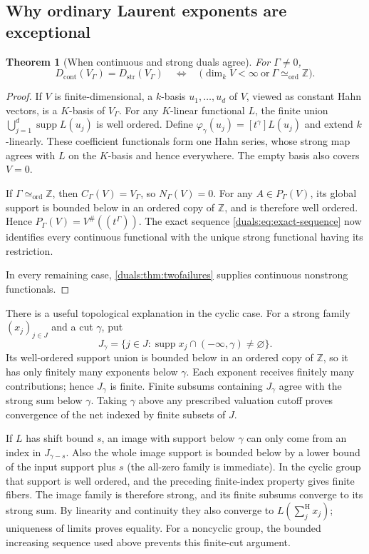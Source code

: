 \documentclass[11pt,letterpaper]{article}
\numberwithin{equation}{section}
\newtheorem{theorem}{Theorem}[section]
\theoremstyle{definition}
\theoremstyle{remark}
\newcommand{\Z}{\mathbb Z}
\newcommand{\supp}{\operatorname{supp}}
\newcommand{\Dstr}{D_{\mathrm{str}}}
\newcommand{\Dcont}{D_{\mathrm{cont}}}
\newcommand{\sH}{\mathop{\sum}\nolimits^{\mathrm H}}
\newcommand{\cyc}{\Gamma\simeq_{\mathrm{ord}}\Z}
\begin{document}
\subsection{Why ordinary Laurent exponents are exceptional}
\begin{theorem}[When continuous and strong duals agree]
\label{duals:thm:continuous-strong}
For $\Gamma\ne0$,
\[
 \Dcont(V_\Gamma)=\Dstr(V_\Gamma)
 \quad\Longleftrightarrow\quad
 \bigl(\dim_kV<\infty\ \text{or}\ \cyc\bigr).
\]
\end{theorem}
\begin{proof}
If $V$ is finite-dimensional, a $k$-basis $u_1,\ldots,u_d$ of $V$,
viewed as constant Hahn vectors, is a $K$-basis of $V_\Gamma$.
For any $K$-linear functional $L$, the finite union
$\bigcup_{j=1}^d\supp L(u_j)$ is well ordered. Define
$\varphi_\gamma(u_j)=[t^\gamma]L(u_j)$ and extend $k$-linearly.
These coefficient functionals form one Hahn series, whose strong map
agrees with $L$ on the $K$-basis and hence everywhere. The empty basis
also covers $V=0$.

If $\Gamma\simeq_{\mathrm{ord}}\Z$, then $C_\Gamma(V)=V_\Gamma$,
so $N_\Gamma(V)=0$. For any $A\in P_\Gamma(V)$, its global support
is bounded below in an ordered copy of $\Z$, and is therefore well
ordered. Hence $P_\Gamma(V)=V^\#((t^\Gamma))$. The exact sequence
\eqref{duals:eq:exact-sequence} now identifies every continuous functional
with the unique strong functional having its restriction.

In every remaining case, \cref{duals:thm:twofailures} supplies continuous
nonstrong functionals.
\end{proof}

There is a useful topological explanation in the cyclic case. For a
strong family $(x_j)_{j\in J}$ and a cut $\gamma$, put
\[
 J_\gamma=\{j\in J:\supp x_j\cap(-\infty,\gamma)\ne\varnothing\}.
\]
Its well-ordered support union is bounded below in an ordered copy of
$\Z$, so it has only finitely many exponents below $\gamma$.
Each exponent receives finitely many contributions; hence $J_\gamma$
is finite. Finite subsums containing $J_\gamma$ agree with the strong
sum below $\gamma$. Taking $\gamma$ above any prescribed valuation
cutoff proves convergence of the net indexed by finite subsets of $J$.

If $L$ has shift bound $s$, an image with support below $\gamma$ can
only come from an index in $J_{\gamma-s}$. Also the whole image support
is bounded below by a lower bound of the input support plus $s$ (the
all-zero family is immediate). In the cyclic group that support is
well ordered, and the preceding finite-index property gives finite
fibers. The image family is therefore strong, and its finite subsums
converge to its strong sum. By linearity and continuity they also
converge to $L(\sH_jx_j)$; uniqueness of limits proves equality.
For a noncyclic group, the bounded increasing sequence used above
prevents this finite-cut argument.
\end{document}
